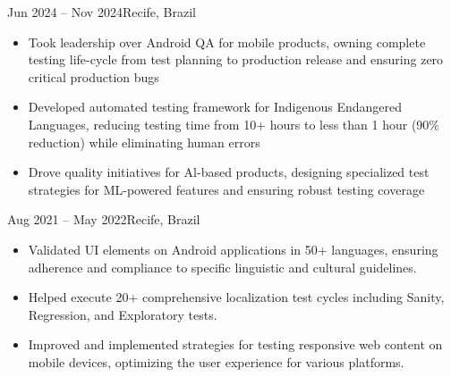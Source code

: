 \documentclass[10pt,a4paper,ragged2e]{altacv}
\begin{document}
\divider

 {Jun 2024 -- Nov 2024}{Recife, Brazil}
\begin{itemize}
\item Took leadership over Android QA for mobile products, owning complete testing life-cycle from test planning to production release and ensuring zero critical production bugs
\item Developed automated testing framework for Indigenous Endangered Languages, reducing testing time from 10+ hours to less than 1 hour (90\% reduction) while eliminating human errors
\item Drove quality initiatives for Al-based products, designing specialized test strategies for ML-powered features and ensuring robust testing coverage
\end{itemize}

\divider

 {Aug 2021 -- May 2022}{Recife, Brazil}
\begin{itemize} 
\item Validated UI elements on Android applications in 50+ languages, ensuring adherence and compliance to specific linguistic and cultural guidelines.
\item Helped execute 20+ comprehensive localization test cycles including Sanity, Regression, and Exploratory tests.
\item Improved and implemented strategies for testing responsive web content on mobile devices, optimizing the user experience for various platforms.
\end{itemize}








\end{document}
